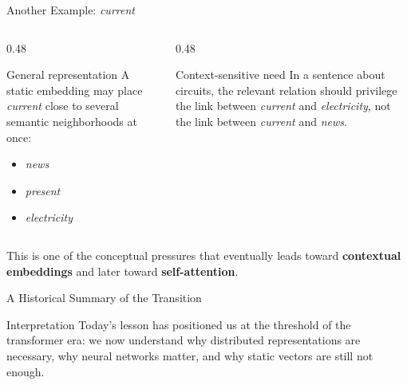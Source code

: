 \documentclass[11pt,aspectratio=169,professionalfonts]{beamer}
\begin{document}
\begin{frame}{Another Example: \textit{current}}
\begin{columns}[T]
\begin{column}{0.48\textwidth}
\begin{block}{General representation}
A static embedding may place \textit{current} close to several semantic neighborhoods at once:
\begin{itemize}
    \item \textit{news}
    \item \textit{present}
    \item \textit{electricity}
\end{itemize}
\end{block}
\end{column}
\begin{column}{0.48\textwidth}
\begin{block}{Context-sensitive need}
In a sentence about circuits, the relevant relation should privilege the link between \textit{current} and \textit{electricity}, not the link between \textit{current} and \textit{news}.
\end{block}
\end{column}
\end{columns}

\vspace{0.2cm}
This is one of the conceptual pressures that eventually leads toward \textbf{contextual embeddings} and later toward \textbf{self-attention}.
\end{frame}
%
%
\begin{frame}{A Historical Summary of the Transition}
\begin{center}
\end{center}

\vspace{0.2cm}
\begin{block}{Interpretation}
Today's lesson has positioned us at the threshold of the transformer era: we now understand why distributed representations are necessary, why neural networks matter, and why static vectors are still not enough.
\end{block}
\end{frame}
%
\end{document}
